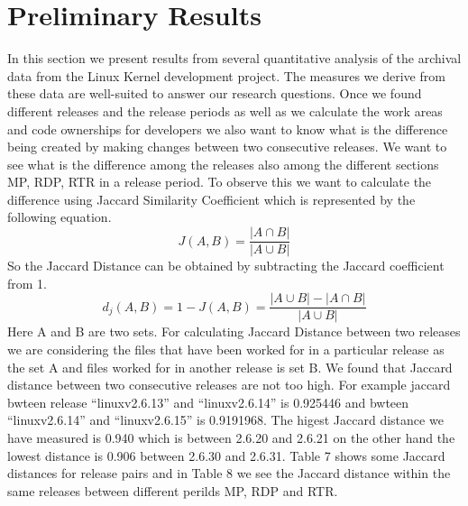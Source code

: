 \documentclass{acm_proc_article-sp}
\begin{document}
\section{Preliminary Results}
In this section we present results from several quantitative analysis of the archival data from the Linux Kernel development project. The measures we derive from these data are well-suited to answer our research questions. Once we found different releases and the release periods as well as we calculate the work areas and code ownerships for developers we also want to know what is the difference being created by making changes between two consecutive releases. We want to see what is the difference among the releases also among the different sections MP, RDP, RTR in a release period. To observe this we want to calculate the difference using Jaccard Similarity Coefficient \cite{17_jaccard} which is represented by the following equation.
\begin{equation} J(A, B) =\frac{|A \cap B|}{|A \cup B|} \end{equation}
So the Jaccard Distance can be obtained by subtracting the Jaccard coefficient from 1.
\begin{equation} d_j(A, B) = 1 - J(A, B) = \frac{|A \cup B|-|A \cap B|}{|A \cup B|} \end{equation}
Here A and B are two sets. For calculating Jaccard Distance between two releases we are considering the files that have been worked for in a particular release as the set A and files worked for in another release is set B. We found that Jaccard distance between two consecutive releases are not too high. For example jaccard bwteen release ``linuxv2.6.13'' and ``linuxv2.6.14'' is 0.925446 and bwteen ``linuxv2.6.14'' and ``linuxv2.6.15'' is 0.9191968. The higest Jaccard distance we have measured is 0.940 which is between 2.6.20 and 2.6.21 on the other hand the lowest distance is 0.906 between 2.6.30 and 2.6.31. Table 7 shows some Jaccard distances for release pairs and in Table 8 we see the Jaccard distance within the same releases between different perilds MP, RDP and RTR.
\end{document}
